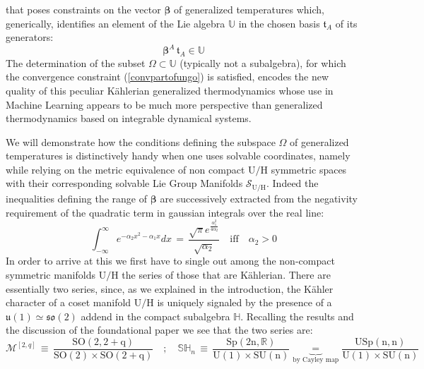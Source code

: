 \documentclass[10pt,a4paper]{article}
\newcommand{\so}{\mathfrak{so}}
\newcommand{\uu}{\mathfrak{u}}
\begin{document}
that poses constraints on the vector $\boldsymbol{\beta}$ of generalized temperatures which, generically, identifies an element of the Lie algebra $\mathbb{U}$ in the chosen basis $\mathfrak{t}_A$ of its generators:
\begin{equation}\label{temperone}
  \boldsymbol{\beta}^A \,\mathfrak{t}_A \in   \mathbb{U}
\end{equation}
The determination of the subset $\Omega \subset \mathbb{U}$ (typically  not a subalgebra), for which the
convergence constraint (\ref{convpartofungo}) is satisfied, encodes the new quality of this peculiar K\"ahlerian generalized thermodynamics whose use in Machine Learning appears to be much more perspective than generalized thermodynamics based on integrable dynamical systems.
\par
We will demonstrate how the conditions defining  the subspace $\Omega$ of generalized temperatures  is distinctively  handy when one uses solvable coordinates, namely while relying on the metric equivalence of non compact $\mathrm{U/H}$ symmetric spaces with their corresponding solvable Lie Group Manifolds $\mathcal{S}_{\mathrm{U/H}}$.
Indeed the inequalities defining the range of $\boldsymbol{\beta}$ are successively extracted from the negativity requirement of the quadratic term in gaussian integrals over the real line:
\begin{equation}\label{positivityconstraint}
  \int_{-\infty}^{\infty}e^{-\alpha _2 x^2-\alpha _1 x} dx \, = \, \frac{\sqrt{\pi } e^{\frac{\alpha _1^2}{4 \alpha _2}}}{\sqrt{\alpha _2}} \quad  \text{iff} \quad  \alpha _2 >0
\end{equation}
In order to arrive at this we first have to single out among the non-compact symmetric manifolds $\mathrm{U/H}$ the series of those that are K\"ahlerian. There are essentially two series, since, as we explained in the introduction, the K\"ahler character of a coset manifold $\mathrm{U/H}$ is uniquely signaled by the presence of a $\uu(1) \simeq\so(2)$ addend in the compact subalgebra $\mathbb{H}$. Recalling the results and the discussion of the foundational paper \cite{pgtstheory} we see that the two series are:
\begin{equation}\label{supercaronte}
  \mathcal{M}^{[2,q]} \, \equiv \,  \frac{\mathrm{SO(2,2+q)}}{\mathrm{SO(2)}\times \mathrm{SO(2+q)}}
  \quad ; \quad \mathbb{SH}_{n}\, \equiv \, \frac{\mathrm{Sp(2n,\mathbb{R})}}{\mathrm{U(1)}\times \mathrm{SU(n)}}
  \underbrace{\, = \,}_{\text{by Cayley
  map}}\frac{\mathrm{USp(n,n)}}{\mathrm{U(1)}\times \mathrm{SU(n)}}
\end{equation}
\end{document}
